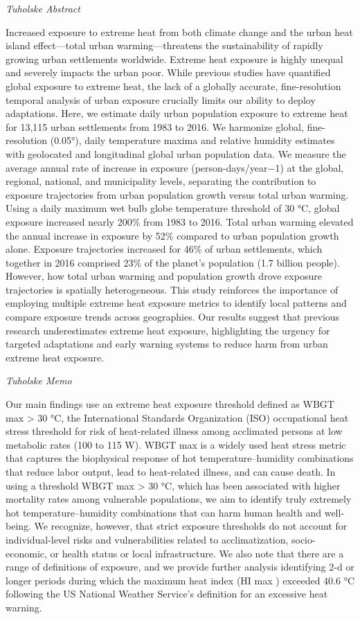 \documentclass[
]{book}
\begin{document}
\emph{Tuholske Abstract}

Increased exposure to extreme heat from both climate change and the urban heat island effect---total urban warming---threatens the sustainability of rapidly growing urban settlements worldwide. Extreme heat exposure is highly unequal and severely impacts the urban poor. While previous studies have quantified global exposure to extreme heat, the lack of a globally accurate, fine-resolution temporal analysis of urban exposure crucially limits our ability to deploy adaptations. Here, we estimate daily urban population exposure to extreme heat for 13,115 urban settlements from 1983 to 2016. We harmonize global, fine-resolution (0.05°), daily temperature maxima and relative humidity estimates with geolocated and longitudinal global urban population data. We measure the average annual rate of increase in exposure (person-days/year−1) at the global, regional, national, and municipality levels, separating the contribution to exposure trajectories from urban population growth versus total urban warming. Using a daily maximum wet bulb globe temperature threshold of 30 °C, global exposure increased nearly 200\% from 1983 to 2016. Total urban warming elevated the annual increase in exposure by 52\% compared to urban population growth alone. Exposure trajectories increased for 46\% of urban settlements, which together in 2016 comprised 23\% of the planet's population (1.7 billion people). However, how total urban warming and population growth drove exposure trajectories is spatially heterogeneous. This study reinforces the importance of employing multiple extreme heat exposure metrics to identify local patterns and compare exposure trends across geographies. Our results suggest that previous research underestimates extreme heat exposure, highlighting the urgency for targeted adaptations and early warning systems to reduce harm from urban extreme heat exposure.

\emph{Tuholske Memo}

Our main findings use an extreme heat exposure threshold defined as
WBGT max \textgreater{} 30 °C, the
International Standards Organization (ISO) occupational heat
stress threshold for risk of heat-related illness among acclimated
persons at low metabolic rates (100 to 115 W). WBGT max is a
widely used heat stress metric that captures the biophysical
response of hot temperature--humidity combinations
that reduce labor output, lead to heat-related illness, and
can cause death. In using a threshold WBGT max \textgreater{} 30 °C,
which has been associated with higher mortality rates among
vulnerable populations, we aim to identify truly extremely hot
temperature--humidity combinations that can harm human
health and well-being.
We recognize, however, that strict exposure
thresholds do not account for individual-level risks and
vulnerabilities related to acclimatization, socio-economic, or health status
or local infrastructure. We also note that there are a
range of definitions of exposure, and we provide further analysis
identifying 2-d or longer periods during which the maximum heat
index (HI max ) exceeded 40.6 °C
following the US National Weather Service's definition for an
excessive heat warning.
\end{document}
